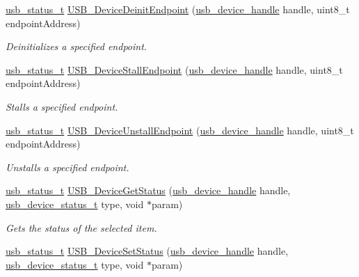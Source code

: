 \begin{DoxyCompactItemize}
\hyperlink{group__usb__drv_ga3172b9f50553fb6d8aa2823d10a39c58}{usb\-\_\-status\-\_\-t} \hyperlink{group__usb__device__driver_ga9bd52faa129ce19404fe65c0b2762533}{U\-S\-B\-\_\-\-Device\-Deinit\-Endpoint} (\hyperlink{group__usb__drv_gae62132dc6e5eba994f8aa56cb7399abc}{usb\-\_\-device\-\_\-handle} handle, uint8\-\_\-t endpoint\-Address)
\begin{DoxyCompactList}\small\item\em Deinitializes a specified endpoint. \end{DoxyCompactList}\item 
\hyperlink{group__usb__drv_ga3172b9f50553fb6d8aa2823d10a39c58}{usb\-\_\-status\-\_\-t} \hyperlink{group__usb__device__driver_ga0f2bd121cf9a12906a41502e97bbb0cb}{U\-S\-B\-\_\-\-Device\-Stall\-Endpoint} (\hyperlink{group__usb__drv_gae62132dc6e5eba994f8aa56cb7399abc}{usb\-\_\-device\-\_\-handle} handle, uint8\-\_\-t endpoint\-Address)
\begin{DoxyCompactList}\small\item\em Stalls a specified endpoint. \end{DoxyCompactList}\item 
\hyperlink{group__usb__drv_ga3172b9f50553fb6d8aa2823d10a39c58}{usb\-\_\-status\-\_\-t} \hyperlink{group__usb__device__driver_gaea23e5d203d473e5b671dcffd8195e4e}{U\-S\-B\-\_\-\-Device\-Unstall\-Endpoint} (\hyperlink{group__usb__drv_gae62132dc6e5eba994f8aa56cb7399abc}{usb\-\_\-device\-\_\-handle} handle, uint8\-\_\-t endpoint\-Address)
\begin{DoxyCompactList}\small\item\em Unstalls a specified endpoint. \end{DoxyCompactList}\item 
\hyperlink{group__usb__drv_ga3172b9f50553fb6d8aa2823d10a39c58}{usb\-\_\-status\-\_\-t} \hyperlink{group__usb__device__driver_ga51519f9172e512afafe55d0b778d4ee3}{U\-S\-B\-\_\-\-Device\-Get\-Status} (\hyperlink{group__usb__drv_gae62132dc6e5eba994f8aa56cb7399abc}{usb\-\_\-device\-\_\-handle} handle, \hyperlink{group__usb__device__driver_ga11ab1b56db153ac62eecf01661216bbf}{usb\-\_\-device\-\_\-status\-\_\-t} type, void $\ast$param)
\begin{DoxyCompactList}\small\item\em Gets the status of the selected item. \end{DoxyCompactList}\item 
\hyperlink{group__usb__drv_ga3172b9f50553fb6d8aa2823d10a39c58}{usb\-\_\-status\-\_\-t} \hyperlink{group__usb__device__driver_gaa47c9ba949d053208ec3e5d8ad5882af}{U\-S\-B\-\_\-\-Device\-Set\-Status} (\hyperlink{group__usb__drv_gae62132dc6e5eba994f8aa56cb7399abc}{usb\-\_\-device\-\_\-handle} handle, \hyperlink{group__usb__device__driver_ga11ab1b56db153ac62eecf01661216bbf}{usb\-\_\-device\-\_\-status\-\_\-t} type, void $\ast$param)

\end{DoxyCompactItemize}
